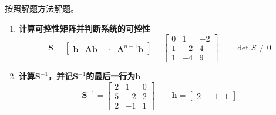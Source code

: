 \solve 按照解题方法解题。
\begin{enumerate}[\textbf{步骤} 1 ]
	\item \textbf{计算可控性矩阵并判断系统的可控性}
	\begin{equation*}
		\bm{S} = 
		\begin{bmatrix}
			\bm{b} & \bm{Ab} & \cdots & \bm{A}^{n-1}\bm{b}
		\end{bmatrix} = 
		\begin{bmatrix}
			0 & 1 & -2\\
			1 & -2 & 4\\
			1 & -4 & 9
		\end{bmatrix}
		\qquad \det S \neq 0
	\end{equation*}
	\item \textbf{计算$\bm{S}^{-1}$，并记$\bm{S}^{-1}$的最后一行为$\bm{h}$}
	\begin{equation*}
		\bm{S}^{-1} = 
		\begin{bmatrix}
			2 & 1 & 0\\
			5 & -2 & 2\\
			2 & -1 & 1
		\end{bmatrix}
	\qquad \bm{h} = 
	\begin{bmatrix}
		2 & -1 & 1
	\end{bmatrix}
	\end{equation*}


\end{enumerate}
